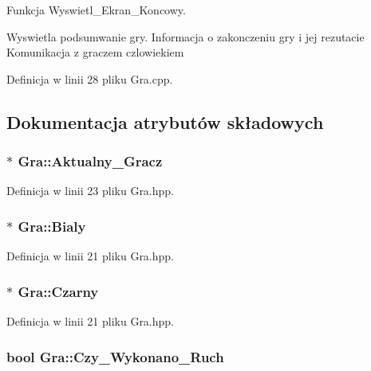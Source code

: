 Funkcja Wyswietl\-\_\-\-Ekran\-\_\-\-Koncowy. 

Wyswietla podsumwanie gry. Informacja o zakonczeniu gry i jej rezutacie Komunikacja z graczem czlowiekiem 

Definicja w linii 28 pliku Gra.\-cpp.



\subsection{Dokumentacja atrybutów składowych}
\hypertarget{class_gra_aebb20692f75bd2d5cfb821a218fc91e4}{
\subsubsection[{Aktualny\-\_\-\-Gracz}]{$\ast$ Gra\-::\-Aktualny\-\_\-\-Gracz}}\label{class_gra_aebb20692f75bd2d5cfb821a218fc91e4}


Definicja w linii 23 pliku Gra.\-hpp.

\hypertarget{class_gra_a6caf1fa51e7849616ba52f880080cdf7}{
\subsubsection[{Bialy}]{$\ast$ Gra\-::\-Bialy}}\label{class_gra_a6caf1fa51e7849616ba52f880080cdf7}


Definicja w linii 21 pliku Gra.\-hpp.

\hypertarget{class_gra_a590d5b5b7630f95e746d0202906207de}{
\subsubsection[{Czarny}]{ $\ast$ Gra\-::\-Czarny}}\label{class_gra_a590d5b5b7630f95e746d0202906207de}


Definicja w linii 21 pliku Gra.\-hpp.

\hypertarget{class_gra_a33cf0aed85fc3245f6dbd7e5a0d801fe}{
\subsubsection[{Czy\-\_\-\-Wykonano\-\_\-\-Ruch}]{\setlength{\rightskip}{0pt plus 5cm}bool Gra\-::\-Czy\-\_\-\-Wykonano\-\_\-\-Ruch}}\label{class_gra_a33cf0aed85fc3245f6dbd7e5a0d801fe}


